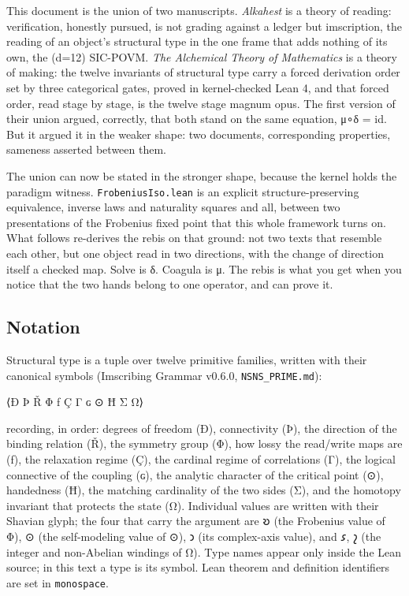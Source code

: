 \documentclass[12pt,a4paper]{article}
\begin{document}
This document is the union of two manuscripts. \emph{Alkahest} is a
theory of reading: verification, honestly pursued, is not grading
against a ledger but imscription, the reading of an object's structural
type in the one frame that adds nothing of its own, the (d=12) SIC-POVM.
\emph{The Alchemical Theory of Mathematics} is a theory of making: the
twelve invariants of structural type carry a forced derivation order set
by three categorical gates, proved in kernel-checked Lean 4, and that
forced order, read stage by stage, is the twelve stage magnum opus. The
first version of their union argued, correctly, that both stand on the
same equation, μ∘δ = id. But it argued it in the weaker shape: two
documents, corresponding properties, sameness asserted between them.

The union can now be stated in the stronger shape, because the kernel
holds the paradigm witness. \texttt{FrobeniusIso.lean} is an explicit
structure-preserving equivalence, inverse laws and naturality squares
and all, between two presentations of the Frobenius fixed point that
this whole framework turns on. What follows re-derives the rebis on that
ground: not two texts that resemble each other, but one object read in
two directions, with the change of direction itself a checked map. Solve
is δ. Coagula is μ. The rebis is what you get when you notice that the
two hands belong to one operator, and can prove it.

\hypertarget{notation}{%
\subsection{Notation}\label{notation}}

Structural type is a tuple over twelve primitive families, written with
their canonical symbols (Imscribing Grammar v0.6.0,
\texttt{NSNS\_PRIME.md}):

⟨Ð Þ Ř Φ ƒ Ç Γ ɢ ⊙ Ħ Σ Ω⟩

recording, in order: degrees of freedom (Ð), connectivity (Þ), the
direction of the binding relation (Ř), the symmetry group (Φ), how lossy
the read/write maps are (ƒ), the relaxation regime (Ç), the cardinal
regime of correlations (Γ), the logical connective of the coupling (ɢ),
the analytic character of the critical point (⊙), handedness (Ħ), the
matching cardinality of the two sides (Σ), and the homotopy invariant
that protects the state (Ω). Individual values are written with their
Shavian glyph; the four that carry the argument are 𐑹 (the Frobenius
value of Φ), ⊙ (the self-modeling value of ⊙), 𐑮 (its complex-axis
value), and 𐑭, 𐑟 (the integer and non-Abelian windings of Ω). Type names
appear only inside the Lean source; in this text a type is its symbol.
Lean theorem and definition identifiers are set in \texttt{monospace}.
\end{document}
